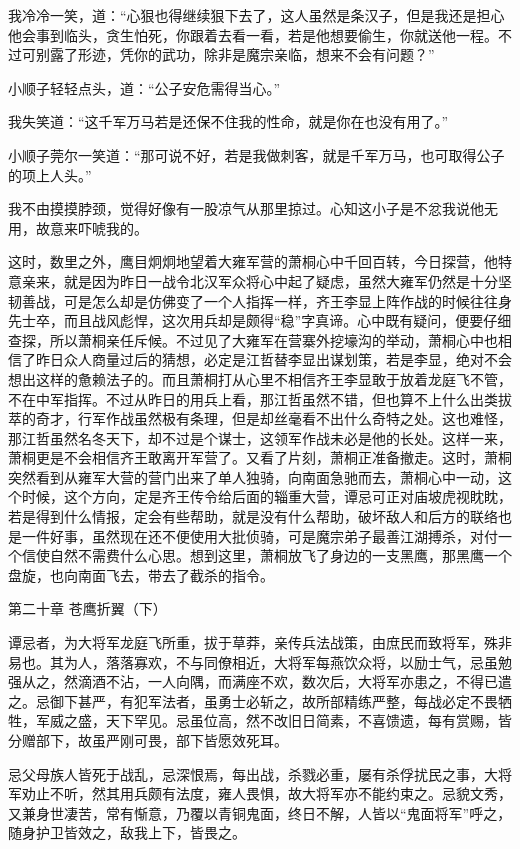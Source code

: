 我冷冷一笑，道：“心狠也得继续狠下去了，这人虽然是条汉子，但是我还是担心他会事到临头，贪生怕死，你跟着去看一看，若是他想要偷生，你就送他一程。不过可别露了形迹，凭你的武功，除非是魔宗亲临，想来不会有问题？”

小顺子轻轻点头，道：“公子安危需得当心。”

我失笑道：“这千军万马若是还保不住我的性命，就是你在也没有用了。”

小顺子莞尔一笑道：“那可说不好，若是我做刺客，就是千军万马，也可取得公子的项上人头。”

我不由摸摸脖颈，觉得好像有一股凉气从那里掠过。心知这小子是不忿我说他无用，故意来吓唬我的。

这时，数里之外，鹰目炯炯地望着大雍军营的萧桐心中千回百转，今日探营，他特意亲来，就是因为昨日一战令北汉军众将心中起了疑虑，虽然大雍军仍然是十分坚韧善战，可是怎么却是仿佛变了一个人指挥一样，齐王李显上阵作战的时候往往身先士卒，而且战风彪悍，这次用兵却是颇得“稳”字真谛。心中既有疑问，便要仔细查探，所以萧桐亲任斥候。不过见了大雍军在营寨外挖壕沟的举动，萧桐心中也相信了昨日众人商量过后的猜想，必定是江哲替李显出谋划策，若是李显，绝对不会想出这样的惫赖法子的。而且萧桐打从心里不相信齐王李显敢于放着龙庭飞不管，不在中军指挥。不过从昨日的用兵上看，那江哲虽然不错，但也算不上什么出类拔萃的奇才，行军作战虽然极有条理，但是却丝毫看不出什么奇特之处。这也难怪，那江哲虽然名冬天下，却不过是个谋士，这领军作战未必是他的长处。这样一来，萧桐更是不会相信齐王敢离开军营了。又看了片刻，萧桐正准备撤走。这时，萧桐突然看到从雍军大营的营门出来了单人独骑，向南面急驰而去，萧桐心中一动，这个时候，这个方向，定是齐王传令给后面的辎重大营，谭忌可正对庙坡虎视眈眈，若是得到什么情报，定会有些帮助，就是没有什么帮助，破坏敌人和后方的联络也是一件好事，虽然现在还不便使用大批侦骑，可是魔宗弟子最善江湖搏杀，对付一个信使自然不需费什么心思。想到这里，萧桐放飞了身边的一支黑鹰，那黑鹰一个盘旋，也向南面飞去，带去了截杀的指令。

第二十章    苍鹰折翼（下）

谭忌者，为大将军龙庭飞所重，拔于草莽，亲传兵法战策，由庶民而致将军，殊非易也。其为人，落落寡欢，不与同僚相近，大将军每燕饮众将，以励士气，忌虽勉强从之，然滴酒不沾，一人向隅，而满座不欢，数次后，大将军亦患之，不得已遣之。忌御下甚严，有犯军法者，虽勇士必斩之，故所部精练严整，每战必定不畏牺牲，军威之盛，天下罕见。忌虽位高，然不改旧日简素，不喜馈遗，每有赏赐，皆分赠部下，故虽严刚可畏，部下皆愿效死耳。

忌父母族人皆死于战乱，忌深恨焉，每出战，杀戮必重，屡有杀俘扰民之事，大将军劝止不听，然其用兵颇有法度，雍人畏惧，故大将军亦不能约束之。忌貌文秀，又兼身世凄苦，常有惭意，乃覆以青铜鬼面，终日不解，人皆以“鬼面将军”呼之，随身护卫皆效之，敌我上下，皆畏之。

